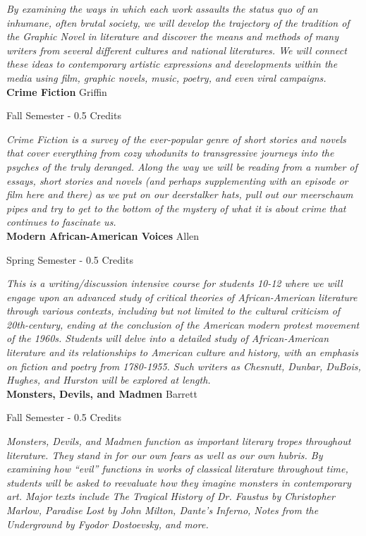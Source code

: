 \vspace{1mm}\emph{By examining the ways in which each work assaults the status quo of an inhumane, often brutal society, we will develop the trajectory of the tradition of the Graphic Novel in literature and discover the means and methods of many writers from several different cultures and national literatures. We will connect these ideas to contemporary artistic expressions and developments within the media using film, graphic novels, music, poetry, and even viral campaigns.}\\


\noindent\textbf{Crime Fiction} \hfill Griffin

\noindent Fall Semester - 0.5 Credits

\vspace{1mm}\emph{Crime Fiction is a survey of the ever-popular genre of short stories and novels that cover everything from cozy whodunits to transgressive journeys into the psyches of the truly deranged. Along the way we will be reading from a number of essays, short stories and novels (and perhaps supplementing with an episode or film here and there) as we put on our deerstalker hats, pull out our meerschaum pipes and try to get to the bottom of the mystery of what it is about crime that continues to fascinate us.}\\


\noindent\textbf{Modern African-American Voices} \hfill Allen

\noindent Spring Semester - 0.5 Credits

\vspace{1mm}\emph{This is a writing/discussion intensive course for students 10-12 where we will engage upon an advanced study of critical theories of African-American literature through various contexts, including but not limited to the cultural criticism of 20th-century, ending at the conclusion of the American modern protest movement of the 1960s. Students will delve into a detailed study of African-American literature and its relationships to American culture and history, with an emphasis on fiction and poetry from 1780-1955. Such writers as Chesnutt, Dunbar, DuBois, Hughes, and Hurston will be explored at length.}\\


\noindent\textbf{Monsters, Devils, and Madmen} \hfill Barrett

\noindent Fall Semester - 0.5 Credits

\vspace{1mm}\emph{Monsters, Devils, and Madmen function as important literary tropes throughout literature.  They stand in for our own fears as well as our own hubris.  By examining how ``evil'' functions in works of classical literature throughout time, students will be asked to reevaluate how they imagine monsters in contemporary art.  Major texts include The Tragical History of Dr. Faustus by Christopher Marlow, Paradise Lost by John Milton, Dante's Inferno, Notes from the Underground by Fyodor Dostoevsky, and more.}\\


